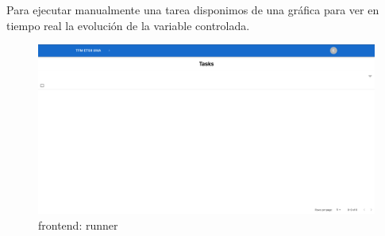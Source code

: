 Para ejecutar manualmente una tarea disponimos de una gráfica para ver en tiempo real la evolución de la variable controlada.

\begin{figure}[H]
    \centering
    \includegraphics[height=0.2\textheight]{./part/Ejecucion/Seguimiento/PuestaAPunto/img/runner}
    \caption{frontend: runner}\label{fig:runner}
\end{figure}